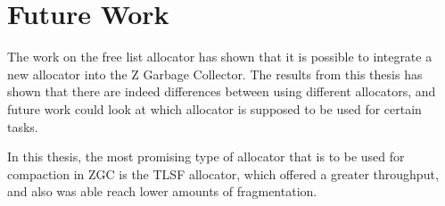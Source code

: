 

\section{Future Work}
\label{sec:future_work}
The work on the free list allocator has shown that it is possible to integrate a new allocator into the Z Garbage Collector. The results from this thesis has shown that there are indeed differences between using different allocators, and future work could look at which allocator is supposed to be used for certain tasks.

In this thesis, the most promising type of allocator that is to be used for compaction in ZGC is the TLSF allocator, which offered a greater throughput, and also was able reach lower amounts of fragmentation.